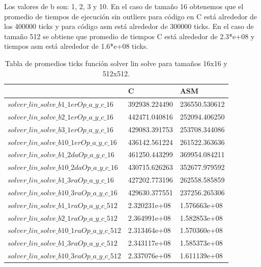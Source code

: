Los valores de b son: 1, 2, 3 y 10. En el caso de tamaño 16 obtenemos que el promedio de tiempos de ejecución sin outliers para código en C está alrededor de los 400000 ticks y para código asm está alrededor de 300000 ticks. En el caso de tamaño 512 se obtiene que promedio de tiempos C está alrededor de 2.3*e+08 y tiempos asm está alrededor de 1.6*e+08 ticks.\newline
\begin{table}[htbp]
\begin{center}
\begin{tabular}{|l|l|l|}
\hline
  & C & ASM\\
\hline \hline
$solver\_lin\_solve\_b1\_1erOp\_a\_y\_c\_16$ & 392938.224490 & 236550.530612\\ \hline

$solver\_lin\_solve\_b2\_1erOp\_a\_y\_c\_16$ & 442471.040816 & 252094.406250\\ \hline

$solver\_lin\_solve\_b3\_1erOp\_a\_y\_c\_16$ & 429083.391753 & 253708.344086\\ \hline

$solver\_lin\_solve\_b10\_1erOp\_a\_y\_c\_16$ & 436142.561224  & 261522.363636\\ \hline


$solver\_lin\_solve\_b1\_2daOp\_a\_y\_c\_16$ & 461250.443299 & 369954.084211\\ \hline

$solver\_lin\_solve\_b10\_2daOp\_a\_y\_c\_16$ & 430715.626263 & 352677.979592\\ \hline

$solver\_lin\_solve\_b1\_3raOp\_a\_y\_c\_16$ & 427202.773196  & 262558.585859\\ \hline


$solver\_lin\_solve\_b10\_3raOp\_a\_y\_c\_16$ & 429630.377551    & 237256.265306\\ \hline

\hline \hline 


$solver\_lin\_solve\_b1\_1raOp\_a\_y\_c\_512$ & 2.320231e+08  & 1.576663e+08\\ \hline

$solver\_lin\_solve\_b2\_1raOp\_a\_y\_c\_512$ & 2.364991e+08  &  1.582853e+08\\ \hline

$solver\_lin\_solve\_b10\_1raOp\_a\_y\_c\_512$ & 2.313464e+08   &  1.570360e+08\\ \hline

$solver\_lin\_solve\_b1\_3raOp\_a\_y\_c\_512$ & 2.343117e+08  & 1.585373e+08\\ \hline

$solver\_lin\_solve\_b10\_3raOp\_a\_y\_c\_512$ & 2.337076e+08 & 1.611139e+08\\ \hline

\end{tabular}
\caption{Tabla de promedios ticks función solver lin solve para tamaños 16x16 y 512x512.}
\end{center}
\end{table}
